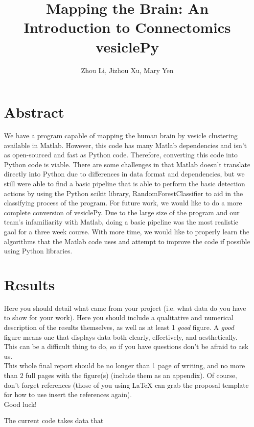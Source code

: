 \documentclass[11pt]{article} %
\title{Mapping the Brain: An Introduction to Connectomics\\vesiclePy}
\author{Zhou Li, Jizhou Xu, Mary Yen}
\begin{document}
\maketitle

\section{Abstract}

We have a program capable of mapping the human brain by vesicle clustering available in Matlab. However, this code has many Matlab dependencies and isn't as open-sourced and fast as Python code. Therefore, converting this code into Python code is viable. There are some challenges in that Matlab doesn't translate directly into Python due to differences in data format and dependencies, but we still were able to find a basic pipeline that is able to perform the basic detection actions by using the Python scikit library, RandomForestClassifier to aid in the classifying process of the program. For future work, we would like to do a more complete conversion of vesiclePy. Due to the large size of the program and our team's infamiliarity with Matlab, doing a basic pipeline was the most realistic gaol for a three week course. With more time, we would like to properly learn the algorithms that the Matlab code uses and attempt to improve the code if possible using Python libraries.

\section{Results}

Here you should detail what came from your project (i.e. what data do you have to show for your work). Here you should include a qualitative and numerical description of the results themselves, as well as at least 1 \emph{good} figure. A \emph{good} figure means one that displays data both clearly, effectively, and aesthetically. This can be a difficult thing to do, so if you have questions don't be afraid to ask us. \\

This whole final report should be no longer than 1 page of writing, and no more than 2 full pages with the figure(s) (include them as an appendix). Of course, don't forget references (those of you using LaTeX can grab the proposal template for how to use insert the references again).\\

Good luck!

The current code takes data that 
\end{document}
